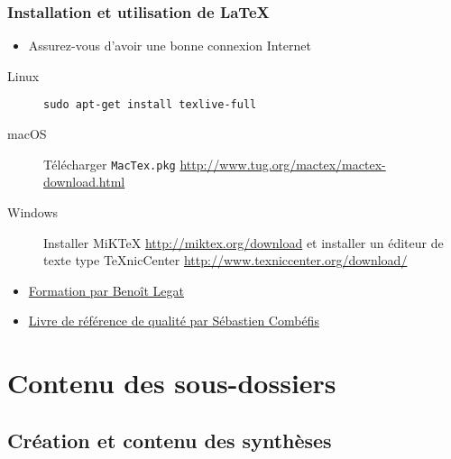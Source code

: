 \documentclass{beamer}
\begin{document}
\begin{frame}[fragile]
    \frametitle{Installation et utilisation de \LaTeX}
    \begin{itemize}
        \item Assurez-vous d'avoir une bonne connexion Internet
    \end{itemize}
    \begin{description}
        \item[Linux] \lstinline|sudo apt-get install texlive-full|
        \item[macOS] Télécharger \lstinline|MacTex.pkg|
            \url{http://www.tug.org/mactex/mactex-download.html}
        \item[Windows] Installer MiKTeX \url{http://miktex.org/download}
            et installer un éditeur de texte type TeXnicCenter
            \url{http://www.texniccenter.org/download/}
    \end{description}
    \begin{itemize}
        \item
            \href{https://github.com/blegat/LaTeXconf/blob/master/main.pdf}{Formation
            par Benoît Legat}
        \item
            \href{http://www.latex-howto.be/files/LaTeX-HowTo-full.pdf}{Livre
            de référence de qualité par Sébastien Combéfis}
    \end{itemize}
\end{frame}

\section{Contenu des sous-dossiers}

\subsection{Création et contenu des synthèses}
\end{document}
